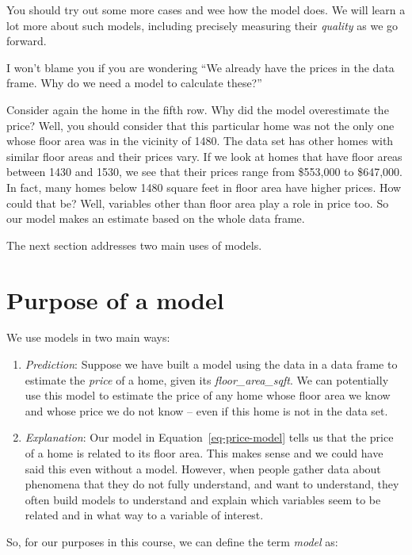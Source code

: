 \documentclass[
  12pt,
  letterpaper,
  DIV=11,
  numbers=noendperiod]{scrreprt}
\providecommand{\tightlist}{%
  \setlength{\itemsep}{0pt}\setlength{\parskip}{0pt}}
\begin{document}
You should try out some more cases and wee how the model does. We will
learn a lot more about such models, including precisely measuring their
\emph{quality} as we go forward.

I won't blame you if you are wondering ``We already have the prices in
the data frame. Why do we need a model to calculate these?''

Consider again the home in the fifth row. Why did the model overestimate
the price? Well, you should consider that this particular home was not
the only one whose floor area was in the vicinity of 1480. The data set
has other homes with similar floor areas and their prices vary. If we
look at homes that have floor areas between 1430 and 1530, we see that
their prices range from \$553,000 to \$647,000. In fact, many homes
below 1480 square feet in floor area have higher prices. How could that
be? Well, variables other than floor area play a role in price too. So
our model makes an estimate based on the whole data frame.

The next section addresses two main uses of models.

\section{Purpose of a model}\label{purpose-of-a-model}

We use models in two main ways:

\begin{enumerate}
\def\labelenumi{\arabic{enumi}.}
\tightlist
\item
  \emph{Prediction}: Suppose we have built a model using the data in a
  data frame to estimate the \emph{price} of a home, given its
  \emph{floor\_area\_sqft}. We can potentially use this model to
  estimate the price of any home whose floor area we know and whose
  price we do not know -- even if this home is not in the data set.
\item
  \emph{Explanation}: Our model in Equation~\ref{eq-price-model} tells
  us that the price of a home is related to its floor area. This makes
  sense and we could have said this even without a model. However, when
  people gather data about phenomena that they do not fully understand,
  and want to understand, they often build models to understand and
  explain which variables seem to be related and in what way to a
  variable of interest.
\end{enumerate}

So, for our purposes in this course, we can define the term \emph{model}
as:
\end{document}
